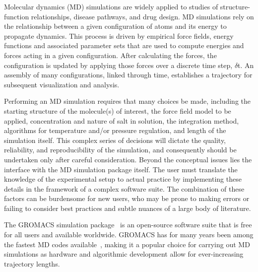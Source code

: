 \documentclass[9pt,tutorial]{livecoms}
\begin{document}


Molecular dynamics (MD) simulations are widely applied to studies of structure-function relationships, disease pathways, and drug design. MD simulations rely on the relationship between a given configuration of atoms and its energy to propagate dynamics. This process is driven by empirical force fields, energy functions and associated parameter sets that are used to compute energies and forces acting in a given configuration. After calculating the forces, the configuration is updated by applying those forces over a discrete time step, $\delta$t. An assembly of many configurations, linked through time, establishes a trajectory for subsequent visualization and analysis.

Performing an MD simulation requires that many choices be made, including the starting structure of the molecule(s) of interest, the force field model to be applied, concentration and nature of salt in solution, the integration method, algorithms for temperature and/or pressure regulation, and length of the simulation itself. This complex series of decisions will dictate the quality, reliability, and reproducibility of the simulation, and consequently should be undertaken only after careful consideration. Beyond the conceptual issues lies the interface with the MD simulation package itself. The user must translate the knowledge of the experimental setup to actual practice by implementing these details in the framework of a complex software suite. The combination of these factors can be burdensome for new users, who may be prone to making errors or failing to consider best practices and subtle nuances of a large body of literature.

The GROMACS simulation package~\cite{Hess2008,Abraham2015} is an open-source software suite that is free for all users and available worldwide. GROMACS has for many years been among the fastest MD codes available~\cite{Hess2008}, making it a popular choice for carrying out MD simulations as hardware and algorithmic development allow for ever-increasing trajectory lengths.
\end{document}
